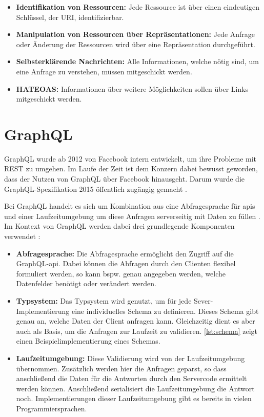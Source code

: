 \begin{itemize}
\item \textbf{Identifikation von Ressourcen:} Jede Ressource ist über einen eindeutigen \\ Schlüssel, der \ac{URI}, identifizierbar.
\item \textbf{Manipulation von Ressourcen über Repräsentationen:} Jede Anfrage oder Änderung der Ressourcen wird über eine Repräsentation durchgeführt. 
\item \textbf{Selbsterklärende Nachrichten:} Alle Informationen, welche nötig sind, um eine Anfrage zu verstehen, müssen mitgeschickt werden.
\item \textbf{HATEOAS:} Informationen über weitere Möglichkeiten sollen über Links mitgeschickt werden.
\end{itemize}

\section{GraphQL}

GraphQL wurde ab 2012 von Facebook intern entwickelt, um ihre Probleme mit \ac{REST} zu umgehen. Im Laufe der Zeit ist dem Konzern dabei bewusst geworden, dass der Nutzen von GraphQL über Facebook hinausgeht. Darum wurde die GraphQL-Spezifikation 2015 öffentlich zugängig gemacht \parencite{Facebook2018}.

Bei GraphQL handelt es sich um Kombination aus eine Abfragesprache für \ac{api}s und einer Laufzeitumgebung um diese Anfragen serverseitig mit Daten zu füllen \parencite{GraphQL2018}. Im Kontext von GraphQL werden dabei drei grundlegende  Komponenten verwendet \parencite{Ionos2019}:

\begin{itemize}
\item \textbf{Abfragesprache:} Die Abfragesprache ermöglicht den Zugriff auf die GraphQL-\ac{api}. Dabei können die Abfragen durch den Clienten flexibel formuliert werden, so kann bspw. genau angegeben werden, welche Datenfelder benötigt oder verändert werden. 
\item \textbf{Typsystem:} Das Typsystem wird genutzt, um für jede Sever-Implementierung eine individuelles Schema zu definieren. Dieses Schema gibt genau an, welche Daten der Client anfragen kann. Gleichzeitig dient es aber auch als Basis, um die Anfragen zur Laufzeit zu validieren. \ref{lst:schema} zeigt einen Beispielimplementierung eines Schemas.
\item \textbf{Laufzeitumgebung:} Diese Validierung wird von der Laufzeitumgebung übernommen. Zusätzlich werden hier die Anfragen geparst, so dass anschließend die Daten für die Antworten durch den Servercode ermittelt werden können. Anschließend serialisiert die Laufzeitumgebung die Antwort noch. Implementierungen dieser Laufzeitumgebung gibt es bereits in vielen Programmiersprachen.
\end{itemize}

